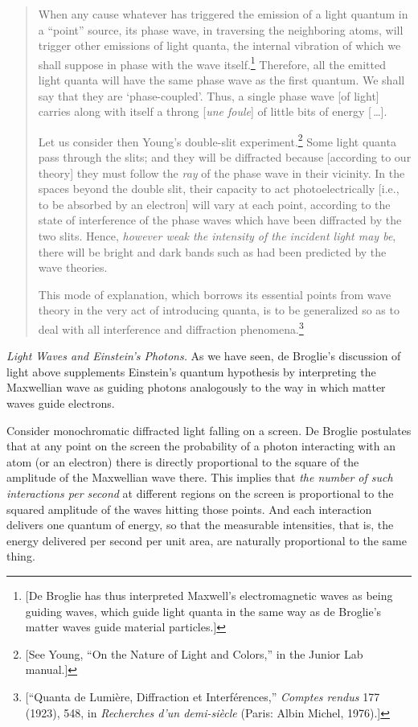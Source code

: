 \begin{quotation}
When any cause whatever has triggered the emission of a light quantum in
a ``point'' source, its phase wave, in traversing the neighboring atoms,
will trigger other emissions of light quanta, the internal vibration of
which we shall suppose in phase with the wave itself.\footnote{{[}De
  Broglie has thus interpreted Maxwell's electromagnetic waves as being
  guiding waves, which guide light quanta in the same way as de
  Broglie's matter waves guide material particles.{]}} Therefore, all
the emitted light quanta will have the same phase wave as the first
quantum. We shall say that they are `phase-coupled'. Thus, a single
phase wave {[}of light{]} carries along with itself a throng
{[}\emph{une foule}{]} of little bits of energy [\,\ldots].

Let us consider then Young's double-slit experiment.\footnote{{[}See Young,
``On the Nature of Light and Colors,'' in the Junior Lab manual.{]}} Some 
light quanta pass through the slits; and they will be
diffracted because {[}according to our theory{]} they must follow the
\emph{ray} of the phase wave in their vicinity. In the spaces beyond the
double slit, their capacity to act photoelectrically {[}i.e., to be
absorbed by an electron{]} will vary at each point, according to the
state of interference of the phase waves which have been diffracted by
the two slits. Hence, \emph{however weak the intensity of the incident
light may be}, there will be bright and dark bands such as had been
predicted by the wave theories.

This mode of explanation, which borrows its essential points from wave
theory in the very act of introducing quanta, is to be generalized so as
to deal with all interference and diffraction phenomena.\footnote{{[}``Quanta
  de Lumière, Diffraction et Interférences,'' \emph{Comptes rendus} 177
  (1923), 548, in \emph{Recherches d'un demi-siècle} (Paris: Albin
  Michel, 1976).{]}}
\end{quotation}

\emph{Light Waves and Einstein's Photons.} As we have seen, de
Broglie's discussion of light above supplements Einstein's quantum
hypothesis by interpreting the Maxwellian wave as guiding photons
analogously to the way in which matter waves guide electrons.

Consider monochromatic diffracted light falling on a screen. De Broglie
postulates that at any point on the screen the probability of a photon
interacting with an atom (or an electron) there is directly proportional
to the square of the amplitude of the Maxwellian wave there. This
implies that \emph{the number of such interactions per second} at
different regions on the screen is proportional to the squared amplitude
of the waves hitting those points. And each interaction delivers one
quantum of energy, so that the measurable intensities, that is, the
energy delivered per second per unit area, are naturally proportional to
the same thing.


